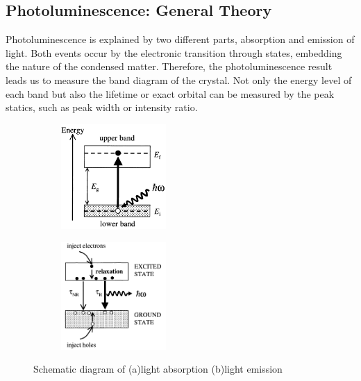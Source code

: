 \documentclass{article}
\begin{document}
\subsection{Photoluminescence: General Theory}
 \label{intro:pl_general_theory}
 Photoluminescence is explained by two different parts, absorption and emission of light.
 Both events occur by the electronic transition through states, embedding the nature of the condensed matter.
 Therefore, the photoluminescence result leads us to measure the band diagram of the crystal.
 Not only the energy level of each band but also the lifetime or exact orbital can be measured by the peak statics, such as peak width or intensity ratio.
 \begin{figure}[ht]
    \centering
    \begin{subfigure}[b]{6cm}
        \centering
        \includegraphics[width=4cm]{../results/intro_energy_absortion.png}
        \caption{}
    \end{subfigure}
    \hfill
    \begin{subfigure}[b]{6cm}
        \centering
        \includegraphics[width=4cm]{../results/intro_energy_emission.png}
        \caption{}
    \end{subfigure}
    \hfill
    \caption{Schematic diagram of (a)light absorption (b)light emission \cite{condensed_matter_optics}}
    \label{fig:pl_intro}
 \end{figure}
\end{document}
